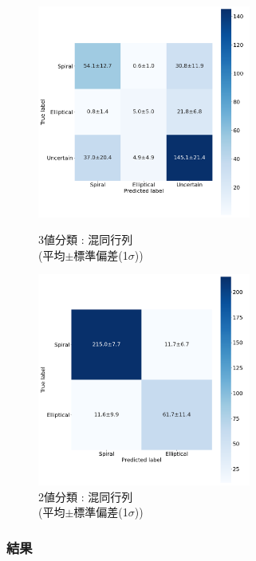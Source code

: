 \documentclass[a4j, 11pt]{jreport}
\begin{document}
\newpage

\begin{figure}[H]
  \begin{minipage}[b]{0.45\hsize}
    \centering
    \includegraphics[keepaspectratio, width=7cm]{images/cm_mean_std_ex4-1.png}
    \caption{3値分類 : 混同行列\\(平均$\pm$標準偏差(1$\sigma$))}
		\label{fig:cm_ex4-1}
  \end{minipage}
  \begin{minipage}[b]{0.45\hsize}
    \centering
    \includegraphics[keepaspectratio, width=7cm]{images/cm_mean_std_ex4-2.png}
    \caption{2値分類 : 混同行列\\(平均$\pm$標準偏差(1$\sigma$))}
		\label{fig:cm_ex4-2}
  \end{minipage}
\end{figure}

\subsubsection{結果}
\end{document}
